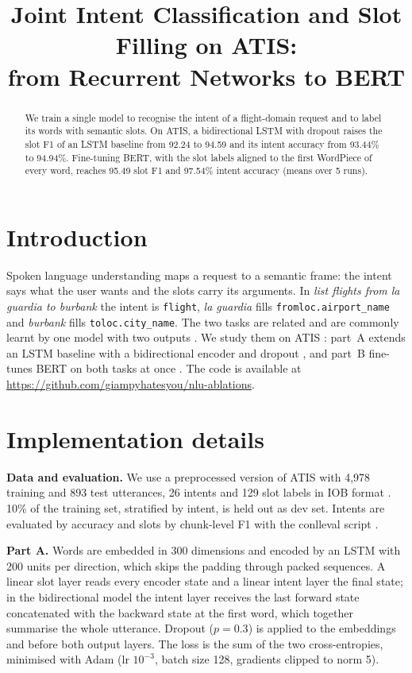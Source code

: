 \documentclass[a4paper]{article}
\title{Joint Intent Classification and Slot Filling on ATIS:\\from Recurrent Networks to BERT}
\begin{document}
\maketitle

\begin{abstract}
We train a single model to recognise the intent of a flight-domain request and to label its words with semantic
slots. On ATIS, a bidirectional LSTM with dropout raises the slot F1 of an LSTM baseline from 92.24 to 94.59 and
its intent accuracy from 93.44\% to 94.94\%. Fine-tuning BERT, with the slot labels aligned to the first WordPiece
of every word, reaches 95.49 slot F1 and 97.54\% intent accuracy (means over 5 runs).
\end{abstract}

\section{Introduction}

Spoken language understanding maps a request to a semantic frame: the intent says what the user wants and the slots
carry its arguments. In \emph{list flights from la guardia to burbank} the intent is \texttt{flight}, \emph{la
guardia} fills \texttt{fromloc.airport\_name} and \emph{burbank} fills \texttt{toloc.city\_name}. The two tasks are
related and are commonly learnt by one model with two outputs \cite{liu2016joint}. We study them on ATIS
\cite{hemphill1990atis}: part~A extends an LSTM baseline with a bidirectional encoder \cite{schuster1997birnn} and dropout \cite{srivastava2014dropout}, and part~B fine-tunes BERT
\cite{devlin2019bert} on both tasks at once \cite{chen2019jointbert}. The code is available at
\url{https://github.com/giampyhatesyou/nlu-ablations}.

\section{Implementation details}

\textbf{Data and evaluation.} We use a preprocessed version of ATIS with 4,978 training and 893 test utterances,
26 intents and 129 slot labels in IOB format \cite{ramshaw1995iob}. 10\% of the training set, stratified by intent,
is held out as dev set. Intents are evaluated by accuracy and slots by chunk-level F1 with the conlleval script
\cite{tjongkimsang2000conll}.

\textbf{Part A.} Words are embedded in 300 dimensions and encoded by an LSTM with 200 units per direction, which
skips the padding through packed sequences. A linear slot layer reads every encoder state and a linear intent layer
the final state; in the bidirectional model the intent layer receives the last forward state concatenated with the
backward state at the first word, which together summarise the whole utterance. Dropout ($p=0.3$) is applied to the
embeddings and before both output layers. The loss is the sum of the two cross-entropies, minimised with Adam
\cite{kingma2015adam} (lr $10^{-3}$, batch size 128, gradients clipped to norm 5).
\end{document}
